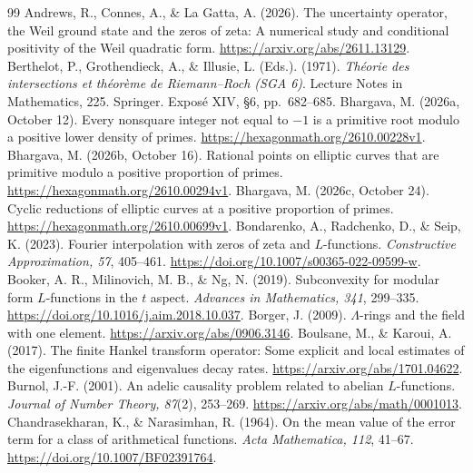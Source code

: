 \begin{thebibliography}{99}
Andrews, R., Connes, A., \& La Gatta, A. (2026). The uncertainty
operator, the Weil ground state and the zeros of zeta: A numerical
study and conditional positivity of the Weil quadratic form.
\url{https://arxiv.org/abs/2611.13129}.
Berthelot, P., Grothendieck, A., \& Illusie, L. (Eds.). (1971).
\emph{Th\'eorie des intersections et th\'eor\`eme de Riemann--Roch
(SGA 6)}. Lecture Notes in Mathematics, 225. Springer.
Expos\'e XIV, \S6, pp.~682--685.
Bhargava, M. (2026a, October 12). Every nonsquare integer not equal
to $-1$ is a primitive root modulo a positive lower density of primes.
\url{https://hexagonmath.org/2610.00228v1}.
Bhargava, M. (2026b, October 16). Rational points on elliptic curves
that are primitive modulo a positive proportion of primes.
\url{https://hexagonmath.org/2610.00294v1}.
Bhargava, M. (2026c, October 24). Cyclic reductions of elliptic curves
at a positive proportion of primes. \url{https://hexagonmath.org/2610.00699v1}.
Bondarenko, A., Radchenko, D., \& Seip, K. (2023).
Fourier interpolation with zeros of zeta and $L$-functions.
\emph{Constructive Approximation, 57}, 405--461.
\url{https://doi.org/10.1007/s00365-022-09599-w}.
Booker, A. R., Milinovich, M. B., \& Ng, N. (2019).
Subconvexity for modular form $L$-functions in the $t$ aspect.
\emph{Advances in Mathematics, 341}, 299--335.
\url{https://doi.org/10.1016/j.aim.2018.10.037}.
Borger, J. (2009). $\Lambda$-rings and the field with one element.
\url{https://arxiv.org/abs/0906.3146}.
Boulsane, M., \& Karoui, A. (2017). The finite Hankel transform
operator: Some explicit and local estimates of the eigenfunctions
and eigenvalues decay rates. \url{https://arxiv.org/abs/1701.04622}.
Burnol, J.-F. (2001). An adelic causality problem related to abelian
$L$-functions. \emph{Journal of Number Theory, 87}(2), 253--269.
\url{https://arxiv.org/abs/math/0001013}.
Chandrasekharan, K., \& Narasimhan, R. (1964).
On the mean value of the error term for a class of arithmetical functions.
\emph{Acta Mathematica, 112}, 41--67.
\url{https://doi.org/10.1007/BF02391764}.

\end{thebibliography}
